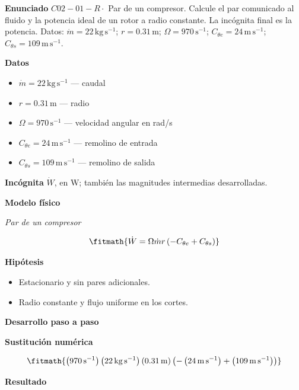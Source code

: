 \documentclass[10pt,openany]{book}
\begin{document}
\begin{tcolorbox}[title={Problema resuelto 1}, studiumworked, breakable]

\noindent\textbf{Enunciado}
\(C02-01-R \cdot\) Par de un compresor. Calcule el par comunicado al fluido y la potencia ideal de un rotor a radio constante. La incógnita final es la potencia. Datos: \(\dot m=22\, \mathrm{kg}\,\mathrm{s}^{-1}\); \(r=0.31\, \mathrm{m}\); \(\Omega=970\, \mathrm{s}^{-1}\); \(C_{\theta e}=24\, \mathrm{m}\,\mathrm{s}^{-1}\); \(C_{\theta s}=109\, \mathrm{m}\,\mathrm{s}^{-1}\).

\noindent\textbf{Datos}
\begin{itemize}
\item $\dot m = 22\,\mathrm{kg}\,\mathrm{s}^{-1}$ — caudal
\item $r = 0.31\,\mathrm{m}$ — radio
\item $\Omega = 970\,\mathrm{s}^{-1}$ — velocidad angular en rad/s
\item $C_{\theta e} = 24\,\mathrm{m}\,\mathrm{s}^{-1}$ — remolino de entrada
\item $C_{\theta s} = 109\,\mathrm{m}\,\mathrm{s}^{-1}$ — remolino de salida
\end{itemize}

\noindent\textbf{Incógnita}
$\dot{W}$, en $\mathrm{W}$; también las magnitudes intermedias desarrolladas.

\noindent\textbf{Modelo físico}

\noindent\textit{Par de un compresor}

\[
\fitmath{\dot{W}=\Omega \dot m r \left(- C_{\theta e} + C_{\theta s}\right)}
\]

\noindent\textbf{Hipótesis}
\begin{itemize}
\item Estacionario y sin pares adicionales.
\item Radio constante y flujo uniforme en los cortes.
\end{itemize}

\noindent\textbf{Desarrollo paso a paso}



\noindent\textbf{Sustitución numérica}

\[
\fitmath{\left(970\,\mathrm{s}^{-1}\right) \left(22\,\mathrm{kg}\,\mathrm{s}^{-1}\right) \left(0.31\,\mathrm{m}\right) \left(- \left(24\,\mathrm{m}\,\mathrm{s}^{-1}\right) + \left(109\,\mathrm{m}\,\mathrm{s}^{-1}\right)\right)}
\]

\noindent\textbf{Resultado}


\end{tcolorbox}
\end{document}
